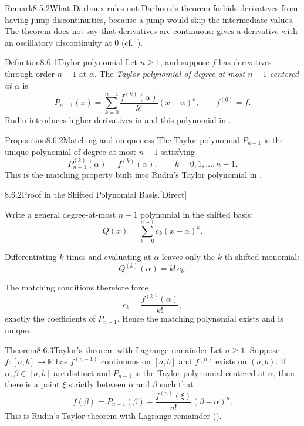 \documentclass[main.tex]{subfiles}
\begin{document}
\begin{ObjL}{Remark}{8.5.2}{What Darboux rules out}
Darboux's theorem forbids derivatives from having jump discontinuities, because a jump would
skip the intermediate values. The theorem does not say that derivatives are continuous:
 gives a derivative with an oscillatory discontinuity at $0$ (cf.\ ).
\end{ObjL}


\begin{Obj}{Definition}{8.6.1}{Taylor polynomial}
Let $n\ge1$, and suppose $f$ has derivatives through order $n-1$ at $\alpha$. The
\emph{Taylor polynomial of degree at most $n-1$ centered at $\alpha$} is
\[
  P_{n-1}(x)=\sum_{k=0}^{n-1}\frac{f^{(k)}(\alpha)}{k!}(x-\alpha)^k,
  \qquad f^{(0)}=f.
\]
Rudin introduces higher derivatives in  and this polynomial in .
\end{Obj}

\begin{Obj}{Proposition}{8.6.2}{Matching and uniqueness}
The Taylor polynomial $P_{n-1}$ is the unique polynomial of degree at most $n-1$ satisfying
\[
  P_{n-1}^{(k)}(\alpha)=f^{(k)}(\alpha),
  \qquad k=0,1,\dots,n-1.
\]
This is the matching property built into Rudin's Taylor polynomial in .
\end{Obj}

\begin{Prf}{8.6.2}{Proof in the Shifted Polynomial Basis.}{[Direct]}
\item Write a general degree-at-most $n-1$ polynomial in the shifted basis:
  \[
    Q(x)=\sum_{k=0}^{n-1}c_k(x-\alpha)^k .
  \]
\item Differentiating $k$ times and evaluating at $\alpha$ leaves only the $k$-th shifted
  monomial:
  \[
    Q^{(k)}(\alpha)=k!\,c_k.
  \]
\item The matching conditions therefore force
  \[
    c_k=\frac{f^{(k)}(\alpha)}{k!},
  \]
  exactly the coefficients of $P_{n-1}$. Hence the matching polynomial exists and is unique.
\end{Prf}

\begin{Obj}{Theorem}{8.6.3}{Taylor's theorem with Lagrange remainder}
Let $n\ge1$. Suppose $f:[a,b]\to\mathbb R$ has $f^{(n-1)}$ continuous on $[a,b]$ and
$f^{(n)}$ exists on $(a,b)$. If $\alpha,\beta\in[a,b]$ are distinct and $P_{n-1}$ is the
Taylor polynomial centered at $\alpha$, then there is a point $\xi$ strictly between
$\alpha$ and $\beta$ such that
\[
  f(\beta)
  =
  P_{n-1}(\beta)+
  \frac{f^{(n)}(\xi)}{n!}(\beta-\alpha)^n .
\]
This is Rudin's Taylor theorem with Lagrange remainder ().
\end{Obj}
\end{document}
